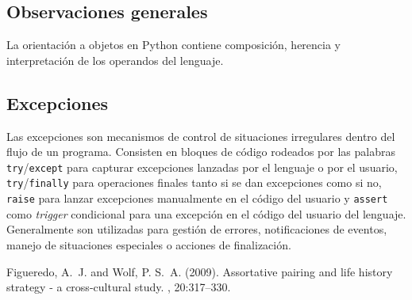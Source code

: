 \documentclass[12pt]{article} %
\begin{document}
\subsection{Observaciones generales}
La orientación a objetos en Python contiene composición, herencia y interpretación de los operandos del lenguaje.
\subsection{Excepciones}
Las excepciones son mecanismos de control de situaciones irregulares dentro del flujo de un programa. Consisten en bloques de código rodeados por las palabras \verb+try+/\verb+except+ para capturar excepciones lanzadas por el lenguaje o por el usuario, \verb+try+/\verb+finally+ para operaciones finales tanto si se dan excepciones como si no, \verb+raise+ para lanzar excepciones manualmente en el código del usuario y \verb+assert+ como \textit{trigger} condicional para una excepción en el código del usuario del lenguaje. Generalmente son utilizadas para gestión de errores, notificaciones de eventos, manejo de situaciones especiales o acciones de finalización.


\begin{thebibliography}{99} %

Figueredo, A.~J. and Wolf, P. S.~A. (2009).
\newblock Assortative pairing and life history strategy - a cross-cultural
  study.
, 20:317--330.
 
\end{thebibliography}

\end{document}
